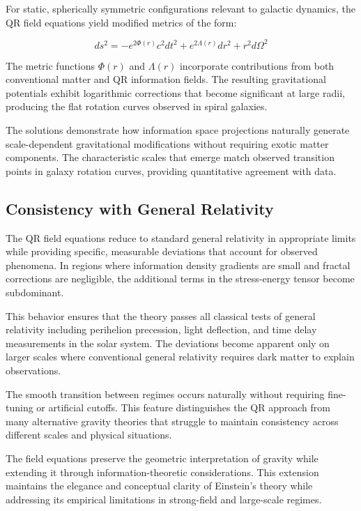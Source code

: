 For static, spherically symmetric configurations relevant to galactic dynamics, the QR field equations yield modified metrics of the form:

\begin{equation}
ds^2 = -e^{2\Phi(r)} c^2 dt^2 + e^{2\Lambda(r)} dr^2 + r^2 d\Omega^2
\label{eq:spherical-metric}
\end{equation}

The metric functions $\Phi(r)$ and $\Lambda(r)$ incorporate contributions from both conventional matter and QR information fields. The resulting gravitational potentials exhibit logarithmic corrections that become significant at large radii, producing the flat rotation curves observed in spiral galaxies.

The solutions demonstrate how information space projections naturally generate scale-dependent gravitational modifications without requiring exotic matter components. The characteristic scales that emerge match observed transition points in galaxy rotation curves, providing quantitative agreement with data.

\subsection{Consistency with General Relativity}
\label{subsec:gr-consistency}

The QR field equations reduce to standard general relativity in appropriate limits while providing specific, measurable deviations that account for observed phenomena. In regions where information density gradients are small and fractal corrections are negligible, the additional terms in the stress-energy tensor become subdominant.

This behavior ensures that the theory passes all classical tests of general relativity including perihelion precession, light deflection, and time delay measurements in the solar system. The deviations become apparent only on larger scales where conventional general relativity requires dark matter to explain observations.

The smooth transition between regimes occurs naturally without requiring fine-tuning or artificial cutoffs. This feature distinguishes the QR approach from many alternative gravity theories that struggle to maintain consistency across different scales and physical situations.

The field equations preserve the geometric interpretation of gravity while extending it through information-theoretic considerations. This extension maintains the elegance and conceptual clarity of Einstein’s theory while addressing its empirical limitations in strong-field and large-scale regimes.